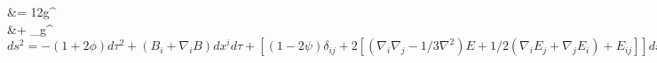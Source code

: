 \documentclass[10pt,letterpaper]{article}
\begin{document}
	&=  \frac12g^{\lambda\rho}  \\
	&\quad + \pd_\mu g^{\lambda\rho} 
\ea
$ ds^2 = -(1+2\phi)d\tau^2 + (B_i + \nabla_i B)dx^i d\tau + [(1-2\psi)\delta_{ij} + 2[ (\nabla_i \nabla_j - 1/3 \nabla^2)E + 1/2( \nabla_i E_j + \nabla_j E_i) + E_{ij}]]dx^i dx^j $
\end{document}
